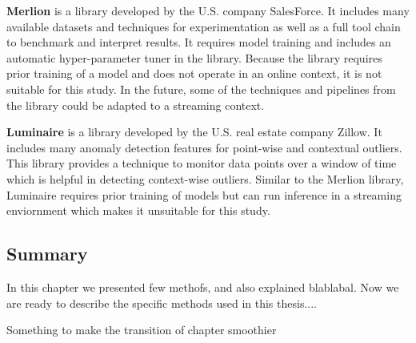 \textbf{Merlion} \parencite{bhatnagar2021merlion} is a library developed by the U.S. company SalesForce. It includes many available datasets and techniques for experimentation as well as a full tool chain to benchmark and interpret results. It requires model training and includes an automatic hyper-parameter tuner in the library. Because the library requires prior training of a model and does not operate in an online context, it is not suitable for this study. In the future, some of the techniques and pipelines from the library could be adapted to a streaming context. 

\textbf{Luminaire} \parencite{chakraborty2020building-luminaire} is a library developed by the U.S. real estate company Zillow. It includes many anomaly detection features for point-wise and contextual outliers. This library provides a technique to monitor data points over a window of time which is helpful in detecting context-wise outliers. Similar to the Merlion library, Luminaire requires prior training of models but can run inference in a streaming enviornment which makes it unsuitable for this study.

\subsection{Summary}
In this chapter we presented few methofs, and also explained blablabal. Now we are ready to describe the specific methods used in this thesis....

Something to make the transition of chapter smoothier





